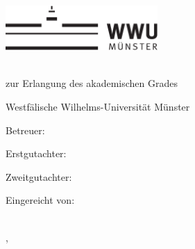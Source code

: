 \thispagestyle{empty}

\begin{center}
    \includegraphics[height=1.7cm]{logos/wwu.pdf}
    \hfill
    \par
    \vspace*{8ex}
    {
        \linespread{0.9}
        \LARGE
        \printtitle
        \par
    }
    \normalsize
    \vspace*{8ex}
    \large
    \textsc{\printtype}\\
    \normalsize
    zur Erlangung des akademischen Grades\\
    \large
    \textsc{\printdegree}
    \par
    \normalsize
    \vspace*{6ex}
    Westfälische Wilhelms-Universität Münster\\
    \printinstitute
\end{center}

\par
\vspace*{6ex}
Betreuer:\\
\large
\textit{\printsupervisor}

\par
\normalsize
\vspace*{2ex}
Erstgutachter:\\
\large
\textit{\printfirstassessor}

\par
\normalsize
\vspace*{2ex}
Zweitgutachter:\\
\large
\textit{\printsecondassessor}

\par
\normalsize
\vspace*{2ex}
Eingereicht von:\\
\large
\textit{\printname} \\




\par
\normalsize
\vspace*{4ex}
\printcity, \makeatletter
\monthname
\makeatother~\the\year
